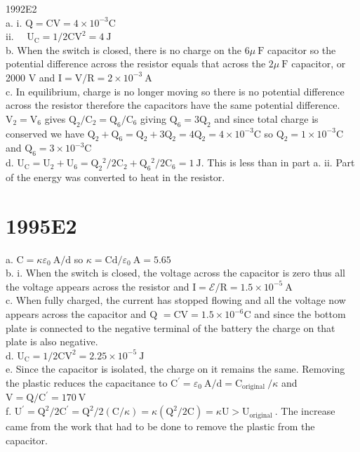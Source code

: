 \begin{enumerate}
1992E2\\
a. i. $\mathrm{Q}=\mathrm{CV}=4 \times 10^{-3} \mathrm{C}$\\
ii. $\quad \mathrm{U}_{\mathrm{C}}=1 / 2 \mathrm{CV}^{2}=4 \mathrm{~J}$\\
b. When the switch is closed, there is no charge on the $6 \mu \mathrm{~F}$ capacitor so the potential difference across the resistor equals that across the $2 \mu \mathrm{~F}$ capacitor, or 2000 V and $\mathrm{I}=\mathrm{V} / \mathrm{R}=2 \times 10^{-3} \mathrm{~A}$\\
c. In equilibrium, charge is no longer moving so there is no potential difference across the resistor therefore the capacitors have the same potential difference. $\mathrm{V}_{2}=\mathrm{V}_{6}$ gives $\mathrm{Q}_{2} / \mathrm{C}_{2}=\mathrm{Q}_{6} / \mathrm{C}_{6}$ giving $\mathrm{Q}_{6}=3 \mathrm{Q}_{2}$ and since total charge is conserved we have $\mathrm{Q}_{2}+\mathrm{Q}_{6}=\mathrm{Q}_{2}+3 \mathrm{Q}_{2}=4 \mathrm{Q}_{2}=4 \times 10^{-3} \mathrm{C}$ so $\mathrm{Q}_{2}=1 \times 10^{-3} \mathrm{C}$ and $\mathrm{Q}_{6}=3 \times 10^{-3} \mathrm{C}$\\
d. $\mathrm{U}_{\mathrm{C}}=\mathrm{U}_{2}+\mathrm{U}_{6}=\mathrm{Q}_{2}{ }^{2} / 2 \mathrm{C}_{2}+\mathrm{Q}_{6}{ }^{2} / 2 \mathrm{C}_{6}=1 \mathrm{~J}$. This is less than in part a. ii. Part of the energy was converted to heat in the resistor.

\section*{1995E2}
a. $\mathrm{C}=\kappa \varepsilon_{0} \mathrm{~A} / \mathrm{d}$ so $\kappa=\mathrm{Cd} / \varepsilon_{0} \mathrm{~A}=5.65$\\
b. i. When the switch is closed, the voltage across the capacitor is zero thus all the voltage appears across the resistor and $\mathrm{I}=\boldsymbol{\mathcal { E }} / \mathrm{R}=1.5 \times 10^{-5} \mathrm{~A}$\\
c. When fully charged, the current has stopped flowing and all the voltage now appears across the capacitor and Q $=\mathrm{CV}=1.5 \times 10^{-6} \mathrm{C}$ and since the bottom plate is connected to the negative terminal of the battery the charge on that plate is also negative.\\
d. $\mathrm{U}_{\mathrm{C}}=1 / 2 \mathrm{CV}^{2}=2.25 \times 10^{-5} \mathrm{~J}$\\
e. Since the capacitor is isolated, the charge on it remains the same. Removing the plastic reduces the capacitance to $\mathrm{C}^{\prime}=\varepsilon_{0} \mathrm{~A} / \mathrm{d}=\mathrm{C}_{\text {original }} / \kappa$ and $\mathrm{V}=\mathrm{Q} / \mathrm{C}^{\prime}=170 \mathrm{~V}$\\
f. $\mathrm{U}^{\prime}=\mathrm{Q}^{2} / 2 \mathrm{C}^{\prime}=\mathrm{Q}^{2} / 2(\mathrm{C} / \kappa)=\kappa\left(\mathrm{Q}^{2} / 2 \mathrm{C}\right)=\kappa \mathrm{U}>\mathrm{U}_{\text {original }}$. The increase came from the work that had to be done to remove the plastic from the capacitor.


\end{enumerate}
